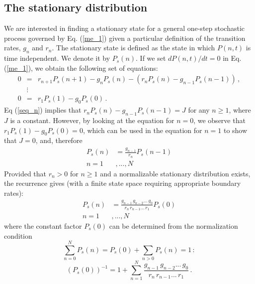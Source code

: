 \subsection{The stationary distribution}
\label{stationary_distribution}
We are interested in finding a stationary state for a general one-step stochastic process governed by Eq. (\ref{me_1}) given a particular definition of the transition rates, $g_n$ and $r_n$. The stationary state is defined as the state in which $P(n, t)$ is time independent. We denote it by $P_s(n)$. If we set $dP(n,t)/dt=0$ in Eq. (\ref{me_1}), we obtain the following set of equations:
\begin{eqnarray}
\label{seq_n}
0 & = & r_{n+1} P_s(n+1) - g_n P_s(n) - (r_n P_s(n) - g_{n-1} P_s(n-1))\,, \\
&\vdots& \nonumber\\
\label{seq_0}
0 & = & r_{1} P_s(1) - g_0 P_s(0)\,.
\end{eqnarray}
Eq (\ref{seq_n}) implies that $r_n P_s(n) - g_{n-1} P_s(n-1) = J$ for any $n \ge 1$, where $J$ is a constant. However, by looking at the equation for $n=0$, we observe that $r_{1} P_s(1) - g_0 P_s(0) = 0$, which can be used in the equation for $n=1$ to show that $J = 0$, and, therefore 
\begin{align}
P_s(n) &= \frac{g_{n-1}}{r_n} P_s(n-1)\nonumber\\
   n =1&,...,N     
\label{balance}
\end{align}
Provided that $r_n>0$ for $n\geq1$ and a normalizable stationary distribution exists, the recurrence gives (with a finite state space requiring appropriate boundary rates): 
\begin{align}
P_s(n)      &= \frac{g_{n-1}\, g_{n-2} ...\, g_0}{r_n\, r_{n-1} ...\, r_1} P_s(0)\nonumber\\
        n =1&,...,N    
\label{P_stationary}
\end{align}
where the constant factor $P_s(0)$ can be determined from the normalization condition
\begin{equation}
\sum_{n=0}^N P_s(n) = P_s(0) + \sum_{n>0} P_s(n) = 1\, :
\label{Norma}
\end{equation}
\begin{equation}
(P_s(0))^{-1} = 1 + \sum_{n=1}^{N} \frac{g_{n-1}\, g_{n-2} ...\, g_0}{r_n\, 
	r_{n-1} ...\, r_1}\, .  
\label{inversionPs(0)}
\end{equation}

